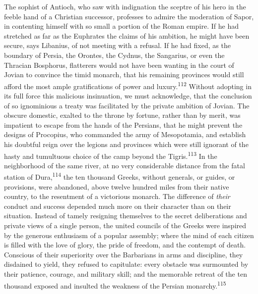 The sophist of Antioch, who saw with indignation the sceptre of
his hero in the feeble hand of a Christian successor, professes
to admire the moderation of Sapor, in contenting himself with so
small a portion of the Roman empire. If he had stretched as far
as the Euphrates the claims of his ambition, he might have been
secure, says Libanius, of not meeting with a refusal. If he had
fixed, as the boundary of Persia, the Orontes, the Cydnus, the
Sangarius, or even the Thracian Bosphorus, flatterers would not
have been wanting in the court of Jovian to convince the timid
monarch, that his remaining provinces would still afford the most
ample gratifications of power and luxury.\textsuperscript{112} Without adopting in
its full force this malicious insinuation, we must acknowledge,
that the conclusion of so ignominious a treaty was facilitated by
the private ambition of Jovian. The obscure domestic, exalted to
the throne by fortune, rather than by merit, was impatient to
escape from the hands of the Persians, that he might prevent the
designs of Procopius, who commanded the army of Mesopotamia, and
establish his doubtful reign over the legions and provinces which
were still ignorant of the hasty and tumultuous choice of the
camp beyond the Tigris.\textsuperscript{113} In the neighborhood of the same
river, at no very considerable distance from the fatal station of
Dura,\textsuperscript{114} the ten thousand Greeks, without generals, or guides,
or provisions, were abandoned, above twelve hundred miles from
their native country, to the resentment of a victorious monarch.
The difference of \textit{their} conduct and success depended much more
on their character than on their situation. Instead of tamely
resigning themselves to the secret deliberations and private
views of a single person, the united councils of the Greeks were
inspired by the generous enthusiasm of a popular assembly; where
the mind of each citizen is filled with the love of glory, the
pride of freedom, and the contempt of death. Conscious of their
superiority over the Barbarians in arms and discipline, they
disdained to yield, they refused to capitulate: every obstacle
was surmounted by their patience, courage, and military skill;
and the memorable retreat of the ten thousand exposed and
insulted the weakness of the Persian monarchy.\textsuperscript{115}



